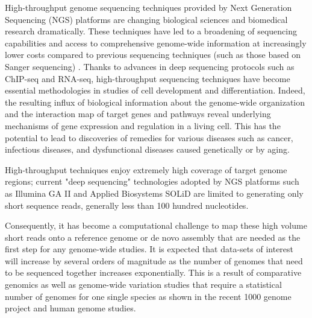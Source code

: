 \documentclass{acm_proc_article-sp}
\begin{document}


High-throughput genome sequencing techniques provided by Next
Generation Sequencing (NGS) platforms are changing biological sciences
and biomedical research dramatically. These techniques have led to a
broadening of sequencing capabilities and access to comprehensive
genome-wide information at increasingly lower costs compared to
previous sequencing techniques (such as those based on Sanger
sequencing)
\cite{metzker2010,mardis2008-tig,mardis2008-arghg,gilad2009,mortazavi2008,sorek2010}.
Thanks to advances in deep sequencing protocols such as ChIP-seq
 and RNA-seq, high-throughput
sequencing techniques have become essential methodologies in studies
of cell development and
differentiation\cite{wang2009-natrevgen,pepke2009,gilad2009,mortazavi2008,sorek2010}.
Indeed, the resulting influx of biological information about the
genome-wide organization and the interaction map of target genes and
pathways reveal underlying mechanisms of gene expression and
regulation in a living cell. This has the potential to lead to
discoveries of remedies for various diseases such as cancer,
infectious diseases, and dysfunctional diseases caused genetically or
by aging\cite{amaral2008,encode2007,baek2008,costa2009}.


High-throughput techniques enjoy extremely high coverage of target
genome regions; current "deep sequencing"
technologies adopted by NGS platforms such as Illumina GA II
and Applied Biosystems SOLiD are limited to generating only short
sequence reads, generally less than 100 hundred
nucleotides\cite{metzker2010}.

Consequently, it has become a computational challenge to map these
high volume short reads onto a reference genome or de novo assembly
that are needed as the first step for any genome-wide
studies\cite{alex2009,trapnell2009,scheibye-alsing2009,pop2002,hernandez2008,farrer2008}.
It is expected that data-sets of interest will increase by several
orders of magnitude as the number of genomes that need to be sequenced
together increases exponentially.  This is a result of comparative
genomics as well as genome-wide variation studies that require a
statistical number of genomes for one single species as shown in the
recent 1000 genome project and human genome
studies\cite{1000genome,mardis2008-tig,gilad2009,alex2009,kim2011}.
\end{document}
